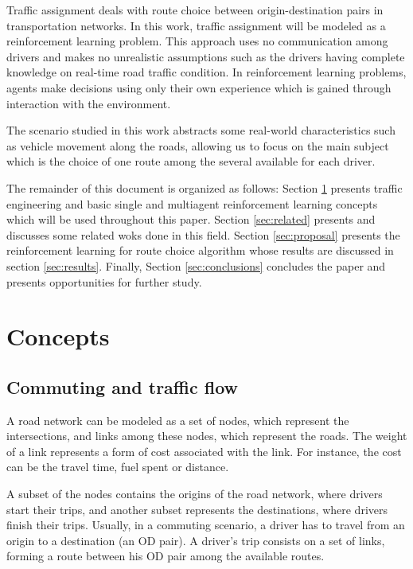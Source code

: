 \documentclass[12pt]{article}
\begin{document}
Traffic assignment deals with route choice between origin-destination pairs in transportation networks. In this work, traffic assignment will be modeled as a reinforcement learning problem. This approach uses no communication among drivers and makes no unrealistic assumptions such as the drivers having complete knowledge on real-time road traffic condition. In reinforcement learning problems, agents make decisions using only their own experience which is gained through interaction with the environment.

The scenario studied in this work abstracts some real-world characteristics such as vehicle movement along the roads, allowing us to focus on the main subject which is the choice of one route among the several available for each driver.

The remainder of this document is organized as follows: Section \ref{sec:concepts} presents traffic engineering and basic single and multiagent reinforcement learning concepts which will be used throughout this paper. Section \ref{sec:related} presents and discusses some related woks done in this field. Section \ref{sec:proposal} presents the reinforcement learning for route choice algorithm whose results are discussed in section \ref{sec:results}. Finally, Section \ref{sec:conclusions} concludes the paper and presents opportunities for further study.

\section{Concepts}
\label{sec:concepts}
\subsection{Commuting and traffic flow}

A road network can be modeled as a set of nodes, which represent the intersections, and links among these nodes, which represent the roads. The weight of a link represents a form of cost associated with the link. For instance, the cost can be the travel time, fuel spent or distance.

A subset of the nodes contains the origins of the road network, where drivers start their trips, and another subset represents the destinations, where drivers finish their trips. Usually, in a commuting scenario, a driver has to travel from an origin to a destination (an OD pair). A driver's trip consists on a set of links, forming a route between his OD pair among the available routes.
\end{document}
